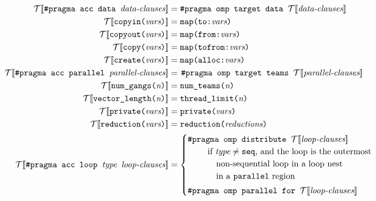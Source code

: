 \documentclass{sig-alternate-05-2015}
\begin{document}
\newcommand{\translate}[1]{\ensuremath{\mathcal{T}[\![ #1 ]\!]}}
\begin{figure*}
\begin{align*}
%
\translate{\texttt{\#pragma acc data\ }\textit{data-clauses}} &=
   \texttt{\#pragma omp target data } \translate{\textit{data-clauses}} \\
%
\translate{\texttt{copyin(}\textit{vars}\texttt{)}} &=
   \texttt{map(to:}\textit{vars}\texttt{)} \\
%
\translate{\texttt{copyout(}\textit{vars}\texttt{)}} &=
   \texttt{map(from:}\textit{vars}\texttt{)} \\
%
\translate{\texttt{copy(}\textit{vars}\texttt{)}} &=
   \texttt{map(tofrom:}\textit{vars}\texttt{)} \\
%
\translate{\texttt{create(}\textit{vars}\texttt{)}} &=
   \texttt{map(alloc:}\textit{vars}\texttt{)} \\
%
\translate{\texttt{\#pragma acc parallel\ }\textit{parallel-clauses}} &=
   \left.\parbox[t]{4in}{%
   \texttt{\#pragma omp target teams\ }\translate{\textit{parallel-clauses}}}\right. \\
%
\translate{\texttt{num\_gangs(}\textit{n}\texttt{)}} &=
   \texttt{num\_teams(}\textit{n}\texttt{)} \\
%
\translate{\texttt{vector\_length(}\textit{n}\texttt{)}} &=
   \texttt{thread\_limit(}\textit{n}\texttt{)} \\
%
\translate{\texttt{private(}\textit{vars}\texttt{)}} &=
   \texttt{private(}\textit{vars}\texttt{)} \\
%
\translate{\texttt{reduction(}\textit{vars}\texttt{)}} &=
   \texttt{reduction(}\textit{reductions}\texttt{)} \\
%
\translate{\texttt{\#pragma acc loop\ }\textit{type}\texttt{\ }\textit{loop-clauses}} &=
   \begin{cases}
   \texttt{\#pragma omp distribute\ }\translate{\textit{loop-clauses}} \\
        \hspace*{2em} \textup{ if $\textit{type} \neq \texttt{seq}$, and the loop is the outermost} \\
        \hspace*{3em} \textup{ non-sequential loop in a loop nest} \\
        \hspace*{3em} \textup{ in a \texttt{parallel} region} \vspace*{.25em} \\
   \texttt{\#pragma omp parallel for\ }\translate{\textit{loop-clauses}} \\

\end{cases}
\end{align*}
\end{figure*}
\end{document}
